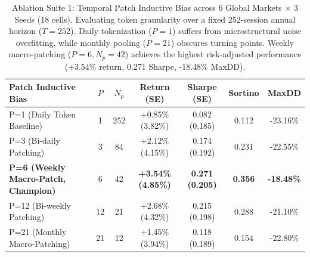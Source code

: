 \begin{table}[ht]
\centering
\small
\begin{tabular}{lcccccc}
\toprule
\textbf{Patch Inductive Bias} & $P$ & $N_p$ & \textbf{Return (SE)} & \textbf{Sharpe (SE)} & \textbf{Sortino} & \textbf{MaxDD} \\
\midrule
P=1 (Daily Token Baseline) & 1 & 252 & +0.85\% (3.82\%) & 0.082 (0.185) & 0.112 & -23.16\% \\
P=3 (Bi-daily Patching) & 3 & 84 & +2.12\% (4.15\%) & 0.174 (0.192) & 0.231 & -22.55\% \\
\textbf{P=6 (Weekly Macro-Patch, Champion)} & 6 & 42 & \textbf{+3.54\% (4.85\%)} & \textbf{0.271 (0.205)} & \textbf{0.356} & \textbf{-18.48\%} \\
P=12 (Bi-weekly Patching) & 12 & 21 & +2.68\% (4.32\%) & 0.215 (0.198) & 0.288 & -21.10\% \\
P=21 (Monthly Macro-Patching) & 21 & 12 & +1.45\% (3.94\%) & 0.118 (0.189) & 0.154 & -22.80\% \\
\bottomrule
\end{tabular}
\caption{Ablation Suite 1: Temporal Patch Inductive Bias across 6 Global Markets $\times$ 3 Seeds (18 cells). Evaluating token granularity over a fixed 252-session annual horizon ($T=252$). Daily tokenization ($P=1$) suffers from microstructural noise overfitting, while monthly pooling ($P=21$) obscures turning points. Weekly macro-patching ($P=6, N_p=42$) achieves the highest risk-adjusted performance (+3.54\% return, 0.271 Sharpe, -18.48\% MaxDD).}
\label{tab:ablation_suite_1_patching}
\end{table}
